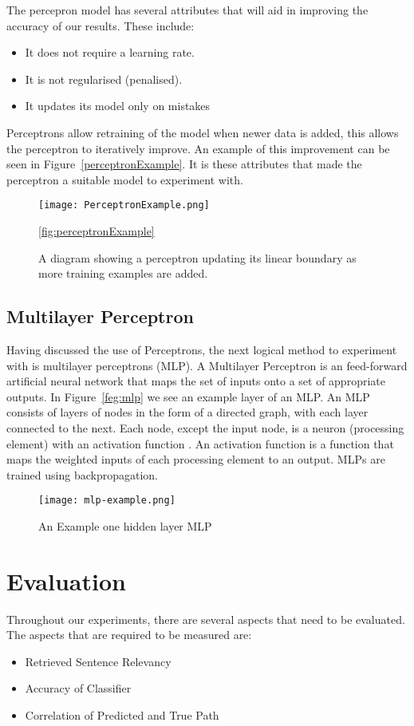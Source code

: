 \documentclass[bsc,frontabs,twoside,singlespacing,parskip,deptreport]{infthesis}     %
\begin{document}
The percepron model has several attributes that will aid in improving the accuracy of our results.
These include:
\begin{itemize}
\item It does not require a learning rate.
\item It is not regularised (penalised).
\item It updates its model only on mistakes
\end{itemize}

Perceptrons allow retraining of the model when newer data is added, this allows the perceptron to
iteratively improve. An example of this improvement can be seen in Figure~\ref{perceptronExample}.
It is these attributes that made the perceptron a suitable model to experiment with.
\begin{figure}[ht]
  \centering
  \texttt{[image: PerceptronExample.png]}
  \caption{A diagram showing a perceptron updating its linear boundary as more training examples are added. }
  \ref{fig:perceptronExample}
\end{figure}

\subsection{Multilayer Perceptron}
Having discussed the use of Perceptrons, the next logical method to experiment with is multilayer perceptrons (MLP).
A Multilayer Perceptron is an feed-forward artificial neural network that maps the set of inputs
onto a set of appropriate outputs.
In Figure~\ref{feg:mlp} we see an example layer of an MLP.
An MLP consists of layers of  nodes in the form of a directed graph, with each layer connected to the next.
Each node, except the input node, is a neuron (processing element) with an activation function \cite{}.%
An activation function is a function that maps the weighted inputs of each processing element to an output.
MLPs are trained using backpropagation.

\begin{figure}
  \centering
  \texttt{[image: mlp-example.png]}
  \caption{An Example one hidden layer MLP \cite{scikit-learn}}
  \label{fig:mlp}
\end{figure}

\section{Evaluation}
Throughout our experiments, there are several aspects that need to be evaluated.
The aspects that are required to be measured are:
\begin{itemize}
  \item Retrieved Sentence Relevancy
  \item Accuracy of Classifier
  \item Correlation of Predicted and True Path
\end{itemize}
\end{document}
